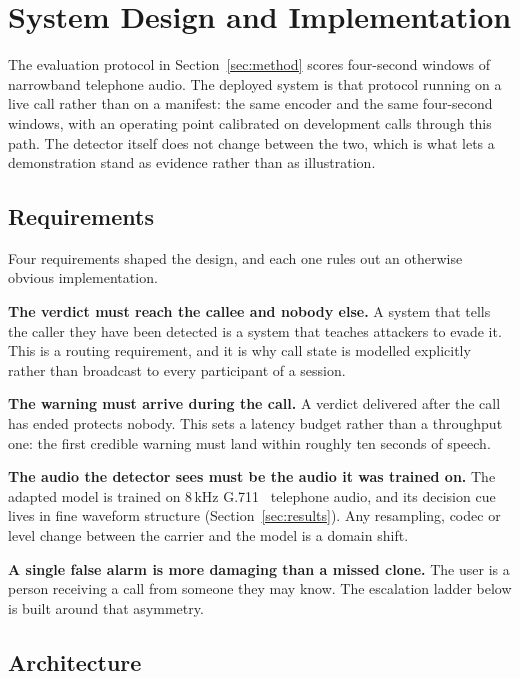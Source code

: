 \section{System Design and Implementation}
\label{sec:system}

The evaluation protocol in Section~\ref{sec:method} scores four-second windows
of narrowband telephone audio. The deployed system is that protocol running on a
live call rather than on a manifest: the same encoder and the same four-second windows,
with an operating point calibrated on development calls through this path. The detector
itself does not change between the two, which is what lets a demonstration stand as
evidence rather than as illustration.

\subsection{Requirements}

Four requirements shaped the design, and each one rules out an otherwise obvious
implementation.

\textbf{The verdict must reach the callee and nobody else.} A system that tells the
caller they have been detected is a system that teaches attackers to evade it. This
is a routing requirement, and it is why call state is modelled explicitly rather
than broadcast to every participant of a session.

\textbf{The warning must arrive during the call.} A verdict delivered after the call
has ended protects nobody. This sets a latency budget rather than a throughput one:
the first credible warning must land within roughly ten seconds of speech.

\textbf{The audio the detector sees must be the audio it was trained on.} The
adapted model is trained on 8\,kHz G.711~\cite{itu1988g711} telephone audio, and its decision cue lives
in fine waveform structure (Section~\ref{sec:results}). Any resampling, codec or
level change between the carrier and the model is a domain shift.

\textbf{A single false alarm is more damaging than a missed clone.} The user is a
person receiving a call from someone they may know. The escalation ladder below is
built around that asymmetry.

\subsection{Architecture}


